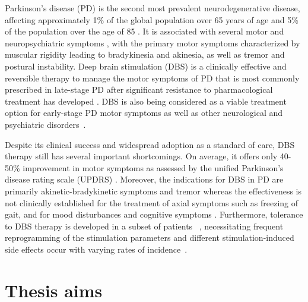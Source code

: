 %
%
%
%
%

%
%

%
%
%
%
%
%
%
%
%
%
%

%
%
%
%
%
%
%
%
%
%
%
%
%
%

%
%
%
%
%
%


%
%

%
%
Parkinson's disease (PD) is the second most prevalent neurodegenerative disease,
affecting approximately 1\% of the global population over 65 years of age and 5\%
of the population over the age of 85 \cite{deRijk1997prevalence}.
It is associated with several motor and neuropsychiatric symptoms \cite{jankovic_parkinsons_2008},
with the primary motor symptoms characterized by muscular rigidity leading to
bradykinesia and akinesia, as well as tremor and postural instability.
%
Deep brain stimulation (DBS) is a clinically effective and reversible therapy
to manage the motor symptoms of PD that is most commonly prescribed in late-stage PD
after significant resistance to pharmacological treatment has developed
%
\cite{pizzolato_deep_2012,bronstein_deep_2011,weaver_bilateral_2009,benabid_deep_2009}.
%
%
%
DBS is also being considered as a viable treatment option for early-stage PD
motor symptoms \cite{schuepbach_neurostimulation_2013,hacker_deep_2015} as well as
other neurological and psychiatric disorders~\cite{lyons_deep_2011,krack_deep_2010}.
%
%

%

%
%
%
Despite its clinical success and widespread adoption as a standard of care,
DBS therapy still has several important shortcomings. On average, it offers
only 40-50\% improvement in motor symptoms as assessed by the unified
Parkinson's disease rating scale (UPDRS)
\cite{chen2006deep,deuschl_randomized_2006,schuepbach_neurostimulation_2013,rabie_improvement_2016}.
Moreover, the indications for DBS in PD are primarily
akinetic-bradykinetic symptoms and tremor whereas the effectiveness is
not clinically established for the treatment of axial symptoms such as freezing of gait,
and for mood disturbances and cognitive symptoms \cite{eisenstein_acute_2014,merola_impulse_2017,huang_deep_2018}.
Furthermore, tolerance to DBS therapy is developed in a subset of patients
~\cite{kumar_long-term_2003,houeto_failure_2000}, necessitating frequent
reprogramming of the stimulation parameters and different stimulation-induced
side effects occur with varying rates of incidence~\cite{guehl_statistical_2007,benabid_deep_2009}.
%

\section{Thesis aims}

